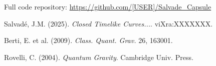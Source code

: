 \documentclass[12pt]{article}
\begin{document}
Full code repository: \url{https://github.com/[USER]/Salvade_Capsule}

\begin{thebibliography}{9}
Salvadé, J.M. (2025). \textit{Closed Timelike Curves...}. viXra:XXXXXXX.

Berti, E. et al. (2009). \textit{Class. Quant. Grav.} 26, 163001.

Rovelli, C. (2004). \textit{Quantum Gravity}. Cambridge Univ. Press.
\end{thebibliography}
\end{document}
